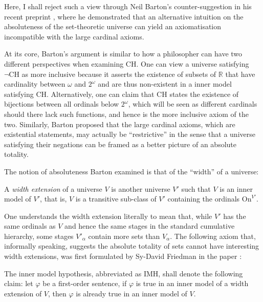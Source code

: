 \documentclass[12pt]{article}
\theoremstyle{plain}
\theoremstyle{definition}
\newcommand{\On}{\mathrm{On}}
\newcommand{\CH}{\mathrm{CH}}
\newcommand{\IMH}{\mathrm{IMH}}
\begin{document}
Here, I shall reject such a view through Neil Barton's counter-suggestion in his recent preprint \cite{barton-large-cardinal-restrictive}, where he demonstrated that an alternative intuition on the absoluteness of the set-theoretic universe can yield an axiomatisation incompatible with the large cardinal axioms.

At its core, Barton's argument is similar to how a philosopher can have two different perspectives when examining $\CH$. One can view a universe satisfying $\neg \CH$ as more inclusive because it asserts the existence of subsets of $\mathbb{R}$ that have cardinality between $\omega$ and $2^\omega$ and are thus non-existent in a inner model satisfying $\CH$. Alternatively, one can claim that $\CH$ states the existence of bijections between all ordinals below $2^\omega$, which will be seen as different cardinals should there lack such functions, and hence is the more inclusive axiom of the two. Similarly, Barton proposed that the large cardinal axioms, which are existential statements, may actually be ``restrictive'' in the sense that a universe satisfying their negations can be framed as a better picture of an absolute totality.

The notion of absoluteness Barton examined is that of the ``width'' of a universe:

\begin{definition}
	A \emph{width extension} of a universe $V$ is another universe $V'$ such that $V$ is an inner model of $V'$, that is, $V$ is a transitive sub-class of $V'$ containing the ordinals $\On^{V'}$.
\end{definition}

One understands the width extension literally to mean that, while $V'$ has the same ordinals as $V$ and hence the same stages in the standard cumulative hierarchy, some stages $V'_\alpha$ contain more sets than $V_\alpha$. The following axiom that, informally speaking, suggests the absolute totality of sets cannot have interesting width extensions, was first formulated by Sy-David Friedman in the paper \cite{friedman-imh-06}:

\begin{definition}
	The inner model hypothesis, abbreviated as $\IMH$, shall denote the following claim: let $\varphi$ be a first-order sentence, if $\varphi$ is true in an inner model of a width extension of $V$, then $\varphi$ is already true in an inner model of $V$.
\end{definition}
\end{document}
